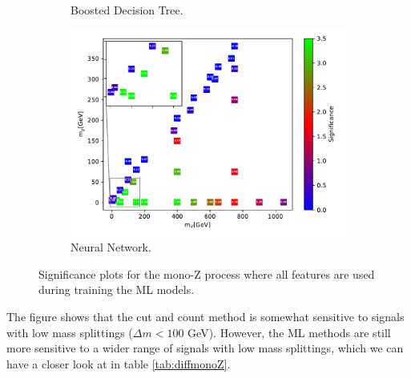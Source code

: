 \begin{figure}[H]
\begin{subfigure}[t!]{0.49\textwidth}
    \caption{Boosted Decision Tree.}
        \label{fig:signAllmonoZBDT}
    \end{subfigure}      
    \begin{subfigure}[t!]{0.49\textwidth}
    \includegraphics[width = \textwidth]{Figures/Significances/significance_NN_monoZ_All_level.pdf}
    \caption{Neural Network.}
        \label{fig:signAllmonoZNN}
    \end{subfigure}
    \caption{Significance plots for the mono-Z process where all features are used during training the ML models.}
    \label{fig:signAllmonoZ}
\end{figure}

The figure shows that the cut and count method is somewhat sensitive to signals with low mass splittings ($\Delta m < 100$ GeV). However, the ML methods are still more sensitive to a wider range of signals with low mass splittings, which we can have a closer look at in table \ref{tab:diffmonoZ}.






